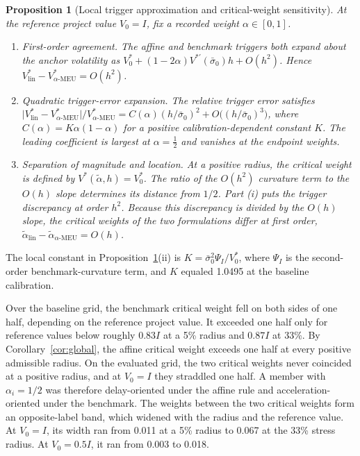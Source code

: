 \documentclass[5p,times,authoryear]{elsarticle}
\theoremstyle{plain}
\newtheorem{proposition}{Proposition}
\newcommand{\sbar}{\bar{\sigma}_0}
\newcommand{\Vzero}{V^{*}_{0}}
\newcommand{\Vlin}{V^{*}_{\mathrm{lin}}}
\newcommand{\VMEU}{V^{*}_{\alpha\text{-MEU}}}
\begin{document}
\begin{proposition}[Local trigger approximation and critical-weight sensitivity]\label{prop:accuracy}
At the reference project value $V_0=I$, fix a recorded weight $\alpha\in[0,1]$.
\begin{enumerate}
\item[(i)] First-order agreement. The affine and benchmark triggers both expand about the anchor volatility as $\Vzero+(1-2\alpha)V^{*\prime}(\sbar)h+O(h^{2})$. Hence $\Vlin-\VMEU=O(h^{2})$.
\item[(ii)] Quadratic trigger-error expansion. The relative trigger error satisfies $\lvert\Vlin-\VMEU\rvert/\VMEU=C(\alpha)(h/\sbar)^{2}+O\bigl((h/\sbar)^{3}\bigr)$, where $C(\alpha)=K\alpha(1-\alpha)$ for a positive calibration-dependent constant $K$. The leading coefficient is largest at $\alpha=\frac{1}{2}$ and vanishes at the endpoint weights.
\item[(iii)] Separation of magnitude and location. At a positive radius, the critical weight is defined by $V^{*}(\tilde{\alpha},h)=\Vzero$. The ratio of the $O(h^{2})$ curvature term to the $O(h)$ slope determines its distance from $1/2$. Part (i) puts the trigger discrepancy at order $h^{2}$. Because this discrepancy is divided by the $O(h)$ slope, the critical weights of the two formulations differ at first order, $\tilde{\alpha}_{\mathrm{lin}}-\tilde{\alpha}_{\alpha\text{-MEU}}=O(h)$.
\end{enumerate}
\end{proposition}

The local constant in Proposition~\ref{prop:accuracy}(ii) is $K=\sbar^{2}\Psi_I/\Vzero$, where $\Psi_I$ is the second-order benchmark-curvature term, and $K$ equaled 1.0495 at the baseline calibration.

Over the baseline grid, the benchmark critical weight fell on both sides of one half, depending on the reference project value. It exceeded one half only for reference values below roughly $0.83I$ at a 5\% radius and $0.87I$ at 33\%. By Corollary~\ref{cor:global}, the affine critical weight exceeds one half at every positive admissible radius. On the evaluated grid, the two critical weights never coincided at a positive radius, and at $V_0=I$ they straddled one half. A member with $\alpha_i=1/2$ was therefore delay-oriented under the affine rule and acceleration-oriented under the benchmark. The weights between the two critical weights form an opposite-label band, which widened with the radius and the reference value. At $V_0=I$, its width ran from 0.011 at a 5\% radius to 0.067 at the 33\% stress radius. At $V_0=0.5I$, it ran from 0.003 to 0.018.
\end{document}
